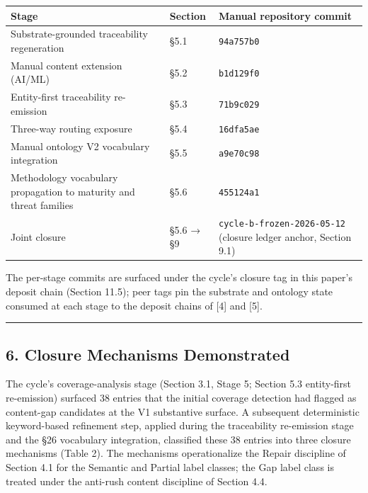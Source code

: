 \documentclass[
]{article}
\begin{document}
\begin{longtable}[]{@{}
  >{\raggedright\arraybackslash}p{}
  >{\raggedright\arraybackslash}p{}
  >{\raggedright\arraybackslash}p{}@{}}
\toprule\noalign{}
\begin{minipage}[b]{\linewidth}\raggedright
Stage
\end{minipage} & \begin{minipage}[b]{\linewidth}\raggedright
Section
\end{minipage} & \begin{minipage}[b]{\linewidth}\raggedright
Manual repository commit
\end{minipage} \\
\midrule\noalign{}
\endhead
\bottomrule\noalign{}
\endlastfoot
Substrate-grounded traceability regeneration & §5.1 &
\texttt{94a757b0} \\
Manual content extension (AI/ML) & §5.2 & \texttt{b1d129f0} \\
Entity-first traceability re-emission & §5.3 & \texttt{71b9c029} \\
Three-way routing exposure & §5.4 & \texttt{16dfa5ae} \\
Manual ontology V2 vocabulary integration & §5.5 & \texttt{a9e70c98} \\
Methodology vocabulary propagation to maturity and threat families &
§5.6 & \texttt{455124a1} \\
Joint closure & §5.6 → §9 & \texttt{cycle-b-frozen-2026-05-12} (closure
ledger anchor, Section 9.1) \\
\end{longtable}

The per-stage commits are surfaced under the cycle's closure tag in this
paper's deposit chain (Section 11.5); peer tags pin the substrate and
ontology state consumed at each stage to the deposit chains of {[}4{]}
and {[}5{]}.

\begin{center}\rule{0.5\linewidth}{0.5pt}\end{center}

\subsection{6. Closure Mechanisms
Demonstrated}\label{closure-mechanisms-demonstrated}

The cycle's coverage-analysis stage (Section 3.1, Stage 5; Section 5.3
entity-first re-emission) surfaced 38 entries that the initial coverage
detection had flagged as content-gap candidates at the V1 substantive
surface. A subsequent deterministic keyword-based refinement step,
applied during the traceability re-emission stage and the §26 vocabulary
integration, classified these 38 entries into three closure mechanisms
(Table 2). The mechanisms operationalize the Repair discipline of
Section 4.1 for the Semantic and Partial label classes; the Gap label
class is treated under the anti-rush content discipline of Section 4.4.
\end{document}
